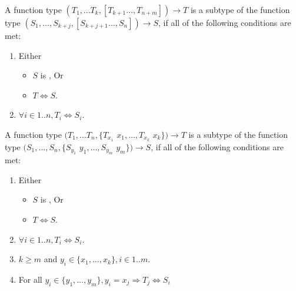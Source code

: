\documentclass{article}
\begin{document}
\LMHash{}
A function type $(T_1, \ldots T_{k}, [T_{k+1}  \ldots, T_{n+m}]) \rightarrow T$ is a subtype of the
function type $(S_1, \ldots, S_{k+j}, [S_{k+j+1} \ldots, S_{n}]) \rightarrow S$, if all of the following conditions are met:
\begin{enumerate}
\item Either
\begin{itemize}
\item $S$ is \VOID{}, Or
\item  $T  \Longleftrightarrow S$.
\end{itemize}
\item $\forall i \in 1 .. n, T_i \Longleftrightarrow S_i$.
\end{enumerate}


\LMHash{}
A function type $(T_1, \ldots T_n, \{T_{x_1}$ $x_1, \ldots, T_{x_k}$ $x_k\}) \rightarrow T$ is a subtype of the function type $(S_1, \ldots, S_n, \{S_{y_1}$ $y_1, \ldots, S_{y_m}$ $y_m\}) \rightarrow S$, if all of the following conditions are met:
\begin{enumerate}
\item Either
\begin{itemize}
\item $S$ is \VOID{}, Or
\item  $T  \Longleftrightarrow S$.
\end{itemize}
\item $\forall i \in 1 .. n, T_i \Longleftrightarrow S_i$.
\item $k \ge m$ and $y_i \in \{x_1,  \ldots, x_k\}, i \in 1 .. m$.
\item For all $y_i \in \{y_1,  \ldots, y_m\}, y_i = x_j \Rightarrow T_j \Longleftrightarrow S_i$
\end{enumerate}



\end{document}
